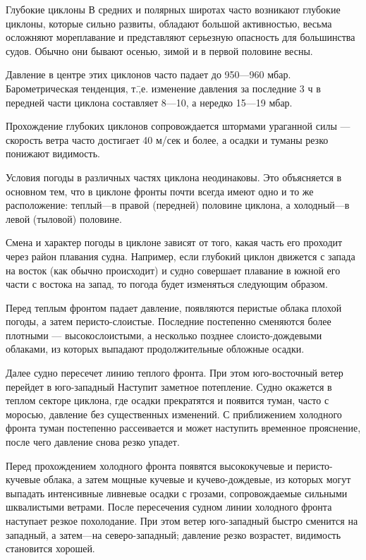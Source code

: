 Глубокие циклоны
В средних и полярных широтах часто возникают глубокие циклоны, которые сильно развиты, обладают большой активностью, весьма осложняют мореплавание и представляют серьезную опасность для большинства судов. Обычно они бывают осенью, зимой и в первой половине весны.

Давление в центре этих циклонов часто падает до 950—960 мбар. Барометрическая тенденция, т.\=,е. изменение давления за последние 3 ч в передней части циклона составляет 8—10, а нередко 15—19 мбар.

Прохождение глубоких циклонов сопровождается штормами ураганной силы — скорость ветра часто достигает 40 м/сек и более, а осадки и туманы резко понижают видимость.

Условия погоды в различных частях циклона неодинаковы. Это объясняется в основном тем, что в циклоне фронты почти всегда имеют одно и то же расположение: теплый—в правой (передней) половине циклона, а холодный—в левой (тыловой) половине.

Смена и характер погоды в циклоне зависят от того, какая часть его проходит через район плавания судна. Например, если глубокий циклон движется с запада на восток (как обычно происходит) и судно совершает плавание в южной его части с востока на запад, то погода будет изменяться следующим образом.

Перед теплым фронтом падает давление, появляются перистые облака плохой погоды, а затем перисто-слоистые. Последние постепенно сменяются более плотными — высокослоистыми, а несколько позднее слоисто-дождевыми облаками, из которых выпадают продолжительные обложные осадки.

Далее судно пересечет линию теплого фронта. При этом юго-восточный ветер перейдет в юго-западный Наступит заметное потепление. Судно окажется в теплом секторе циклона, где осадки прекратятся и появится туман, часто с моросью, давление без существенных изменений. С приближением холодного фронта туман постепенно рассеивается и может наступить временное прояснение, после чего давление снова резко упадет.

Перед прохождением холодного фронта появятся высококучевые и перисто-кучевые облака, а затем мощные кучевые и кучево-дождевые, из которых могут выпадать интенсивные ливневые осадки с грозами, сопровождаемые сильными шквалистыми ветрами. После пересечения судном линии холодного фронта наступает резкое похолодание. При этом ветер юго-западный быстро сменится на западный, а затем—на северо-западный; давление резко возрастет, видимость становится хорошей.

